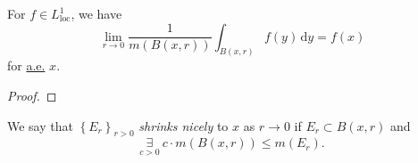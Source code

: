 \begin{corollary}
	For \(f\in L^1_{\text{loc} }\), we have
	\[
		\lim\limits_{r \to 0} \frac{1}{m(B(x, r))}\int_{B(x, r)}^{} f(y) \,\mathrm{d}y = f(x)
	\]
	for \hyperref[def:mu-almost-everywhere]{a.e.} \(x\).
\end{corollary}
\begin{proof}
\end{proof}

\begin{definition}\label{def:shrink-nicely}
	We say that \(\left\{E_{r} \right\}_{r>0}\) \emph{shrinks nicely} to \(x\) as \(r\to 0\) if \(E_{r} \subset B(x, r)\) and
	\[
		\underset{c>0}{\exists } \ c\cdot m(B(x, r)) \leq m(E_{r} ).
	\]
\end{definition}